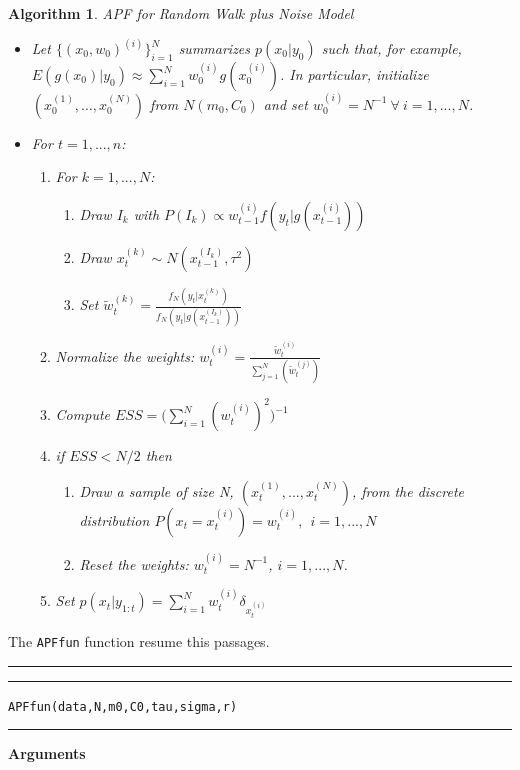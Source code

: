 \documentclass[
]{book}
\theoremstyle{break}
\theoremstyle{nonumberplain}
\newtheorem{algorithm}{Algorithm}[section]
\begin{document}
\begin{algorithm} APF for Random Walk plus Noise Model
\begin{itemize}
\item Let $\{(x_{0},w_{0})^{(i)}\}_{i=1}^{N}$ summarizes $p(x_{0}|y_{0})$ such that, for example, $E(g(x_{0})|y_{0}) \approx \sum_{i=1}^{N}w_{0}^{(i)}g(x_{0}^{(i)})$. In particular, initialize $(x_{0}^{(1)},...,x_{0}^{(N)})$ from $N(m_{0},C_{0})$ and set $w_{0}^{(i)}=N^{-1} \ \forall \ i=1,...,N$.
\item For $t=1,...,n$:
\begin{enumerate}
\item For $k=1,...,N$:
\begin{enumerate}
\item Draw $I_{k}$ with $P(I_{k}) \propto w_{t-1}^{(i)}f(y_{t}|g(x_{t-1}^{(i)})) $
\item Draw $x_{t}^{(k)} \sim N(x_{t-1}^{(I_{k})},\tau^2)$
\item Set  $\tilde{w}_{t}^{(k)} = \frac{f_{N}(y_{t}|x_{t}^{(k)})}{f_{N}(y_{t}|g(x_{t-1}^{(I_{k})}))}$
\end{enumerate}
\item Normalize the weights: $w_{t}^{(i)}=\frac{\tilde{w}_{t}^{(i)}}{\sum_{j=1}^{N}(\tilde{w}_{t}^{(j)})}$
\item Compute $ESS=\Bigg(\sum_{i=1}^{N}(w_{t}^{(i)})^{2}\Bigg)^{-1}$
\item if $ESS<N/2$ then
\begin{enumerate}
\item Draw a sample of size N, $(x_{t}^{(1)},...,x_{t}^{(N)})$, from the discrete distribution $P(x_{t}=x_{t}^{(i)})=w_{t}^{(i)},\ \ i=1,...,N$
\item Reset the weights: $w_{t}^{(i)}=N^{-1}$, $i=1,...,N$.
\end{enumerate}
\item Set $p(x_{t}|y_{1:t})=\sum_{i=1}^{N}w_{t}^{(i)}\delta_{x_{t}^{(i)}}$
\end{enumerate}
\end{itemize}
\end{algorithm}

The \texttt{APFfun} function resume this passages.\\

\hrule
\hrule

\hfill\break
\texttt{APFfun(data,N,m0,C0,tau,sigma,r)}\\

\hrule

\hfill\break
\textbf{Arguments}
\end{document}
